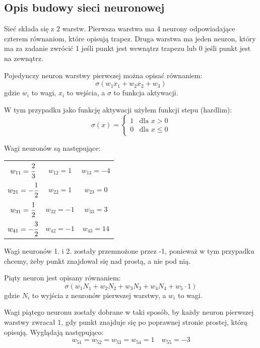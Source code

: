 \documentclass{article}
\begin{document}
\subsection{Opis budowy sieci neuronowej}

Sieć składa się z 2 warstw. Pierwsza warstwa ma 4 neurony odpowiadające
czterem równaniom, które opisują trapez. Druga warstwa ma jeden neuron, który
ma za zadanie zwrócić 1 jeśli punkt jest wewnątrz trapezu lub 0 jeśli punkt
jest na zewnątrz.

Pojedynczy neuron warstwy pierwszej można opisać równaniem:
\begin{equation}
    \sigma(w_1x_1 + w_2x_2 + w_3)
\end{equation}
gdzie $w_i$ to wagi, $x_i$ to wejścia, a $\sigma$ to funkcja
aktywacji. 

W tym przypadku jako funkcję aktywacji użyłem funkcji stepu (hardlim):
\begin{equation}
    \sigma(x) = \begin{cases}
        1 & \text{dla } x > 0 \\
        0 & \text{dla } x \leq 0
    \end{cases}
\end{equation}

Wagi neuronów są następujące:

\begin{table}[H]
    \centering
    \begin{tabular}{c c c}
        $w_{11} = \cfrac{2}{3}$ & $w_{12} = 1$ & $w_{13} = -4$ \\
        $w_{21} = -\cfrac{1}{2}$ & $w_{22} = 1$ & $w_{23} = 0$ \\
        $w_{31} = \cfrac{1}{2}$ & $w_{32} = -1$ & $w_{33} = 3$ \\
        $w_{41} = -\cfrac{3}{2}$ & $w_{42} = -1$ & $w_{43} = 14$ \\
    \end{tabular}
\end{table}

Wagi neuronów 1. i 2. zostały przemnożone przez -1, ponieważ
w tym przypadku chcemy, żeby punkt znajdował się nad prostą,
a nie pod nią.

Piąty neuron jest opisany równaniem:
\begin{equation}
    \sigma(w_1N_1 + w_2N_2 + w_3N_3 + w_4N_4 + w_5\cdot1)
\end{equation}
gdzie $N_i$ to wyjścia z neuronów pierwszej warstwy, a $w_i$ to wagi.

Wagi piątego neuronu zostały dobrane w taki sposób, by każdy neuron pierwszej warstwy zwracał
1, gdy punkt znajduje się po poprawnej stronie prostej, którą opisują. 
Wyglądają następująco:
\begin{equation}
    w_{51} = w_{52} = w_{53} = w_{54} = 1 \quad w_{55} = -3
\end{equation}
\end{document}
